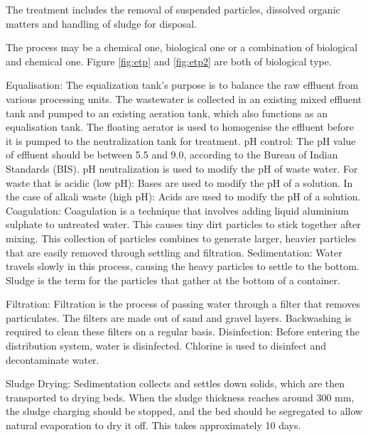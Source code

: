 The treatment includes the removal of suspended particles, dissolved organic matters and handling of sludge for disposal.

The process may be a chemical one, biological one or a combination of biological and chemical one. Figure \ref{fig:etp} and \ref{fig:etp2} are both of biological type.

Equalisation: The equalization tank's purpose is to balance the raw effluent from various processing units. The wastewater is collected in an existing mixed effluent tank and pumped to an existing aeration tank, which also functions as an equalisation tank. The floating aerator is used to homogenise the effluent before it is pumped to the neutralization tank for treatment.
pH control: The pH value of effluent should be between 5.5 and 9.0, according to the Bureau of Indian Standards (BIS). pH neutralization is used to modify the pH of waste water.
For waste that is acidic (low pH): Bases are used to modify the pH of a solution.
In the case of alkali waste (high pH): Acids are used to modify the pH of a solution.
Coagulation: Coagulation is a technique that involves adding liquid aluminium sulphate to untreated water. This causes tiny dirt particles to stick together after mixing. This collection of particles combines to generate larger, heavier particles that are easily removed through settling and filtration.
Sedimentation: Water travels slowly in this process, causing the heavy particles to settle to the bottom. Sludge is the term for the particles that gather at the bottom of a container.

Filtration: Filtration is the process of passing water through a filter that removes particulates. The filters are made out of sand and gravel layers. Backwashing is required to clean these filters on a regular basis.
Disinfection: Before entering the distribution system, water is disinfected. Chlorine is used to disinfect and decontaminate water.

Sludge Drying: Sedimentation collects and settles down solids, which are then transported to drying beds. When the sludge thickness reaches around 300 mm, the sludge charging should be stopped, and the bed should be segregated to allow natural evaporation to dry it off. This takes approximately 10 days.

